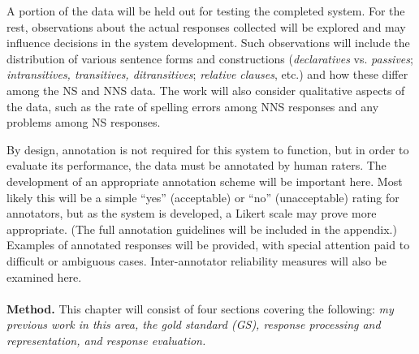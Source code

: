 \par A portion of the data will be held out for testing the completed system. For the rest, observations about the actual responses collected will be explored and may influence decisions in the system development. Such observations will include the distribution of various sentence forms and constructions (\textit{declaratives} vs. \textit{passives}; \textit{intransitives, transitives, ditransitives}; \textit{relative clauses}, etc.) and how these differ among the NS and NNS data. The work will also consider qualitative aspects of the data, such as the rate of spelling errors among NNS responses and any problems among NS responses.
\par By design, annotation is not required for this system to function, but in order to evaluate its performance, the data must be annotated by human raters. The development of an appropriate annotation scheme will be important here. Most likely this will be a simple ``yes'' (acceptable) or ``no'' (unacceptable) rating for annotators, but as the system is developed, a Likert scale may prove more appropriate. 
 (The full annotation guidelines will be included in the appendix.) Examples of annotated responses will be provided, with special attention paid to difficult or ambiguous cases. Inter-annotator reliability measures will also be examined here.\\
\\
\textbf{Method.} This chapter will consist of four sections covering the following: \textit{my previous work in this area, the gold standard (GS), response processing and representation, and response evaluation.}\\
\\
